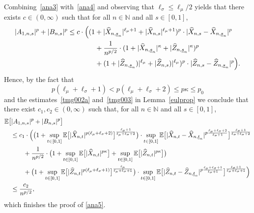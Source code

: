 \documentclass[11pt]{amsart}
\newcommand{\N}{{\mathbb N}}
\newcommand{\EE}{{\mathbb E}}
\newcommand{\eul}{{\widehat X}}
\newcommand{\eultr}{{\widehat Z}}
\newcommand{\usn}{\underline {s}_n}
\newcommand{\utn}{\underline {t}_n}
\theoremstyle{plain}
\theoremstyle{definition}
\begin{document}
 Combining~\eqref{ana3} with~\eqref{ana4} and observing that $\ell_\sigma \le \ell_\mu/2$ yields  that there exists $c\in (0,\infty)$ such that for all $n\in\N$ and all $s\in [0,1]$,
 \begin{align*}
 	\begin{aligned}
	|A_{1,n,s}|^p +	|B_{n,s}|^p  & \le
		c\cdot\Bigl((1+ |\eul_{n,\usn}|^{\ell_\mu+1}+ |\eul_{n,s}|^{\ell_\mu+1}   )^p \cdot |\eul_{n,s}- \eul_{n,\usn}|^p \\
			& \qquad\qquad +	\frac{1}{n^{p/2}} \cdot( 1+ |\widehat X_{n,\usn}|^{\kappa} + |\widehat Z_{n,\usn}|^{\kappa} )^p \\
				& \qquad\qquad +  (1+ |\eultr_{n,\usn})|^{\ell_\mu}  + |\eultr_{n,s})|^{\ell_\mu} )^p\cdot   |\eultr_{n,s}- \eultr_{n,\usn}| ^p\Bigr).
 	\end{aligned}
\end{align*}		
Hence, by the fact that
\[
p(\ell_\mu +\ell_\sigma +1) < p(\ell_\mu +\ell_\sigma +2)\le p\kappa \le p_0
\]
and the
estimates~\eqref{tmg002a} and~\eqref{tmg003} in Lemma~\ref{eulprop} we conclude that there exist $c_1,c_2\in (0,\infty)$ such that, for all $n\in\N$ and all $s\in [0,1]$,
\begin{align*}
&	\EE\bigl[	|A_{1,n,s}|^p +	|B_{n,s}|^p\bigr] \\
		&\quad \le c_1 \cdot\Bigl( \bigl(1+\sup_{t\in[0,1]}\EE\bigl[  |\eul_{n,t}|^{p(\ell_\mu+\ell_\sigma+2)}  \bigr]^{\frac{\ell_\mu+1}{\ell_\mu+\ell_\sigma+2}}\bigr)\cdot \sup_{t\in[0,1]}\EE\bigl[  |\eul_{n,t}- \eul_{n,\utn}|^{p\frac{\ell_\mu+\ell_\sigma+2}{\ell_\sigma+1}}\bigr]^{\frac{\ell_\sigma+1}{\ell_\sigma+\ell_\sigma+2}}\\
		& \qquad\quad +	\frac{1}{n^{p/2}} \cdot \bigl(1+\sup_{t\in[0,1]}\EE\bigl[  |\eul_{n,t}|^{p\kappa}\bigr] + \sup_{t\in[0,1]}\EE\bigl[  |\eultr_{n,t}|^{p\kappa}\bigr] \bigr)\\
			&\qquad \quad +  \bigl(1+\sup_{t\in[0,1]}\EE\bigl[  |\eultr_{n,t}|^{p(\ell_\mu+\ell_\sigma+1)}  \bigr]^{\frac{\ell_\mu}{\ell_\mu+\ell_\sigma+1}}\bigr)\cdot \sup_{t\in[0,1]}\EE\bigl[  |\eultr_{n,t}- \eultr_{n,\utn}|^{p\frac{\ell_\mu+\ell_\sigma+1}{\ell_\sigma+1}}\bigr]^{\frac{\ell_\sigma+1}{\ell_\sigma+\ell_\sigma+1}}\Bigr)\\
			&\quad \le\frac{c_2}{n^{p/2}},
\end{align*}	
which finishes the proof of \eqref{ana5}.
\end{document}
